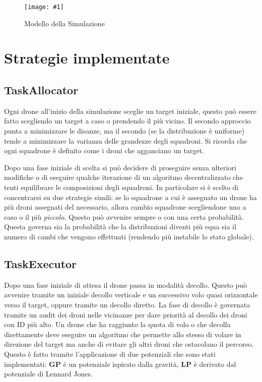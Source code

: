 \documentclass[a4paper,11pt,oneside, table]{article}
\newcommand{\putimage}[4] {
	\begin{figure}[H]
	    \centering
	    \texttt{[image: \#1]}
	    \caption{#2}\label{#3}
	\end{figure}
}
\begin{document}
\putimage{images/simulation-model.png}{Modello della Simulazione}{png:simulation-model}{0.99}

\section{Strategie implementate}

\subsection{TaskAllocator}

Ogni drone all'inizio della simulazione sceglie un target iniziale, questo pu\`o essere fatto scegliendo un target a caso o prendendo il pi\`u vicino.
Il secondo approccio punta a minimizzare le disanze, ma il secondo (se la distribuzione \`e uniforme) tende a minimizzare la varianza delle grandezze degli squadroni.
Si ricorda che ogni squadrone \`e definito come i droni che agganciano un target.

Dopo una fase iniziale di scelta si pu\`o decidere di proseguire senza ulteriori modifiche o di eseguire qualche iterazione di un algoritmo decentralizzato che tenti equilibrare le composizioni degli squadroni.
In particolare si \`e scelto di concentrarsi su due strategie simili: se lo squadrone a cui \`e assegnato un drone ha pi\`u droni assegnati del necessario, allora cambio squadrone scegliendone uno a caso o il pi\`u \textit{piccolo}.
Questo pu\`o avvenire sempre o con una certa probabilit\`a. Questa governa sia la probabilit\`a che la distribuzioni diventi pi\`u equa sia il numero di cambi che vengono effettuati (rendendo pi\`u instabile lo stato globale).

\subsection{TaskExecutor}

Dopo una fase iniziale di attesa il drone passa in modalit\`a decollo. Questo pu\`o avvenire tramite un iniziale decollo verticale e un successivo volo quasi orizzontale verso il target, oppure tramite un decollo diretto.
La fase di decollo \`e governata tramite un audit dei droni nelle vicinanze per dare priorit\`a al decollo dei droni con ID pi\`u alto.
Un drone che ha raggiunto la quota di volo o che decolla direttamente deve eseguire un algoritmo che permette allo stesso di volare in direzione del target ma anche di evitare gli altri droni che ostacolano il percorso.
Questo \`e fatto tramite l'applicazione di due potenziali che sono stati implementati: \textbf{GP} \`e un potenziale ispirato dalla gravit\`a, \textbf{LP} \`e derivato dal potenziale di Lennard Jones.
\end{document}
